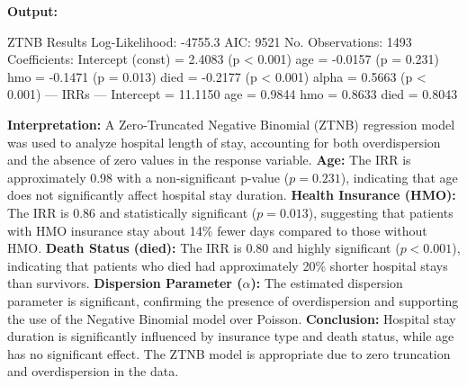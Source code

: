 \documentclass[12pt,a4paper]{article}
\begin{document}
\textbf{Output:}
\begin{codebox}
ZTNB Results
Log-Likelihood: -4755.3
AIC: 9521
No. Observations: 1493
Coefficients:
Intercept (const) = 2.4083 (p < 0.001)
age = -0.0157 (p = 0.231)
hmo = -0.1471 (p = 0.013)
died = -0.2177 (p < 0.001)
alpha = 0.5663 (p < 0.001)
--- IRRs ---
Intercept = 11.1150
age = 0.9844
hmo = 0.8633
died = 0.8043
\end{codebox}

\textbf{Interpretation:}
A Zero-Truncated Negative Binomial (ZTNB) regression model was used to analyze hospital length of stay, accounting for both overdispersion and the absence of zero values in the response variable.
\textbf{Age:} The IRR is approximately 0.98 with a non-significant p-value ($p = 0.231$), indicating that age does not significantly affect hospital stay duration.
\textbf{Health Insurance (HMO):} The IRR is 0.86 and statistically significant ($p = 0.013$), suggesting that patients with HMO insurance stay about 14\% fewer days compared to those without HMO.
\textbf{Death Status (died):} The IRR is 0.80 and highly significant ($p < 0.001$), indicating that patients who died had approximately 20\% shorter hospital stays than survivors.
\textbf{Dispersion Parameter ($\alpha$):} The estimated dispersion parameter is significant, confirming the presence of overdispersion and supporting the use of the Negative Binomial model over Poisson.
\textbf{Conclusion:} Hospital stay duration is significantly influenced by insurance type and death status, while age has no significant effect.
The ZTNB model is appropriate due to zero truncation and overdispersion in the data.
\end{document}
